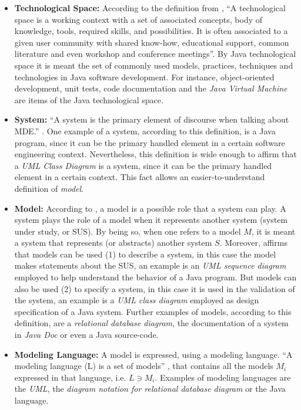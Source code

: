 \documentclass[tuberlin,cic,tc,english,noabntcite,oneside]{iiufrgs}
\begin{document}
\begin{itemize}
	\item \textbf{Technological Space:} According to the definition from \citet[p. 1]{kurtev2002technological}, \enquote{A technological space is a working context with a set of associated concepts, body of knowledge, tools, required skills, and possibilities. It is often associated to a given user community with shared know-how, educational support, common literature and even workshop and conference meetings}. By Java technological space it is meant the set of commonly used models, practices, techniques and technologies in Java software development. For instance, object-oriented development, unit tests, code documentation and the \emph{Java Virtual Machine} are items of the Java technological space.

	\item \textbf{System:} \enquote{A system is the primary element of discourse when talking about MDE.} \citep[p. 13]{favre2004foundations}. One example of a system, according to this definition, is a Java program, since it can be the primary handled element in a certain software engineering context. Nevertheless, this definition is wide enough to affirm that a \emph{UML Class Diagram} is a system, since it can be the primary handled element in a certain context. This fact allows an easier-to-understand definition of \emph{model}.

	\item \textbf{Model:} According to \citet{favre2004foundations}, a model is a possible role that a system can play. A system plays the role of a model when it represents another system (system under study, or SUS). By being so, when one refers to a model $M$, it is meant a system that represents (or abstracts) another system $S$. Moreover, \citet{seidewitz2003models} affirms that models can be used (1) to describe a system, in this case the model makes statements about the SUS, an example is an \emph{UML sequence diagram} employed to help understand the behavior of a Java program. But models can also be used (2) to specify a system, in this case it is used in the validation of the system, an example is a \emph{UML class diagram} employed as design specification of a Java system. Further examples of models, according to this definition, are a \emph{relational database diagram}, the documentation of a system in \emph{Java Doc} or even a Java source-code.

	\item \textbf{Modeling Language:} A model is expressed, using a modeling language. \enquote{A modeling language (L) is a set of models} \citep[p. 13]{favre2004foundations}, that contains all the models $M_i$ expressed in that language, i.e. $L \owns M_i$. Examples of modeling languages are the \emph{UML}, the \emph{diagram notation for relational database diagram} or the Java language.


\end{itemize}
\end{document}
